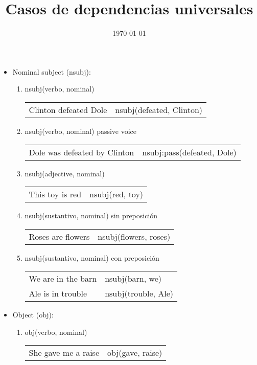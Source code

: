 \documentclass{article}
\title{Casos de dependencias universales}
\date{\today}
\begin{document}
	\maketitle
	
	\begin{itemize}
		\item Nominal subject (nsubj): 
		\begin{enumerate}
			\item nsubj(verbo, nominal)\\
			\begin{tabular}{cc}
			Clinton defeated Dole & nsubj(defeated, Clinton)
			\end{tabular}
		
			\item nsubj(verbo, nominal) passive voice\\
			\begin{tabular}{cc}
				Dole was defeated by Clinton & nsubj:pass(defeated, Dole)
			\end{tabular}
			
			\item nsubj(adjective, nominal)\\
			\begin{tabular}{cc}
				This toy is red & nsubj(red, toy)
			\end{tabular}
		
			\item nsubj(sustantivo, nominal) sin preposición\\
			\begin{tabular}{cc}
				Roses are flowers & nsubj(flowers, roses)
			\end{tabular}
		
			\item nsubj(sustantivo, nominal) con preposición\\
			\begin{tabular}{ll}
				We are in the barn & nsubj(barn, we)\\
				Ale is in trouble & nsubj(trouble, Ale)
			\end{tabular}
		\end{enumerate}
	
		\item Object (obj):
		\begin{enumerate}
			\item obj(verbo, nominal)\\
			\begin{tabular}{cc}
				She gave me a raise & obj(gave, raise)
			\end{tabular}
		\end{enumerate}
	\end{itemize}
\end{document}
